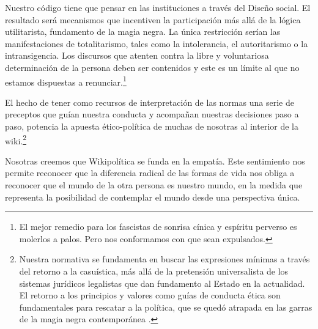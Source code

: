 Nuestro código tiene que pensar en las instituciones a través del Diseño
social. El resultado será mecanismos que incentiven la participación más
allá de la lógica utilitarista, fundamento de la magia negra. La única
restricción serían las manifestaciones de totalitarismo, tales como la
intolerancia, el autoritarismo o la intransigencia. Los discursos que
atenten contra la libre y voluntariosa determinación de la persona deben
ser contenidos y este es un límite al que no estamos dispuestas a
renunciar.\footnote{El mejor remedio para los fascistas de sonrisa
  cínica y espíritu perverso es molerlos a palos. Pero nos conformamos
  con que sean expulsados.}

El hecho de tener como recursos de interpretación de las normas una
serie de preceptos que guían nuestra conducta y acompañan nuestras
decisiones paso a paso, potencia la apuesta ético-política de muchas de
nosotras al interior de la wiki.\footnote{Nuestra normativa se
  fundamenta en buscar las expresiones mínimas a través del retorno a la
  casuística, más allá de la pretensión universalista de los sistemas
  jurídicos legalistas que dan fundamento al Estado en la actualidad. El
  retorno a los principios y valores como guías de conducta ética son
  fundamentales para rescatar a la política, que se quedó atrapada en
  las garras de la magia negra
  contemporánea \cite{Tiqqun2013}.}

Nosotras creemos que Wikipolítica se funda en la empatía. Este
sentimiento nos permite reconocer que la diferencia radical de las
formas de vida nos obliga a reconocer que el mundo de la otra persona es
nuestro mundo, en la medida que representa la posibilidad de contemplar
el mundo desde una perspectiva única.
